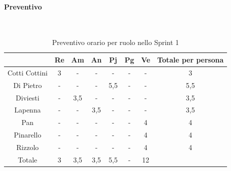\documentclass{article}
\begin{document}
                \paragraph{Preventivo}\mbox{}\\
                \begin{table}[H]
                    \centering
                    \begin{tabular}{|c|c|c|c|c|c|c|c|}
                    \hline
                                  & Re  & Am  & An  & Pj  & Pg  & Ve  & Totale per persona \\ \hline
                    Cotti Cottini & 3   & -   & -   & -   & -   & -   & 3                  \\ \hline
                    Di Pietro     & -   & -   & -   & 5,5 & -   & -   & 5,5                \\ \hline
                    Diviesti      & -   & 3,5 & -   & -   & -   & -   & 3,5                \\ \hline
                    Lapenna       & -   & -   & 3,5 & -   & -   & -   & 3,5                \\ \hline
                    Pan           & -   & -   & -   & -   & -  & 4   & 4                 \\ \hline
                    Pinarello     & -   & -   & -   & -   & -   & 4   & 4                  \\ \hline
                    Rizzolo       & -   & -   & -   & -   & -   & 4   & 4                  \\ \hline
                    Totale        & 3   & 3,5 & 3,5 & 5,5 & -  & 12  &                    \\ \hline
                    \end{tabular}
                    \caption{Preventivo orario per ruolo nello Sprint 1}
                \end{table}

\end{document}
